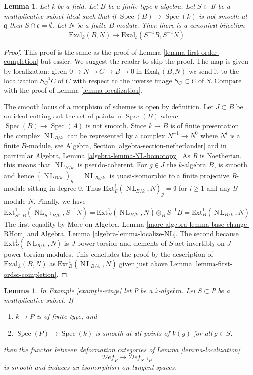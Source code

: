 \documentclass{stacks-project}
\theoremstyle{plain}
\newtheorem{lemma}[subsection]{Lemma}
\theoremstyle{definition}
\theoremstyle{remark}
\numberwithin{equation}{subsection}
\def\Spec{\mathop{\mathrm{Spec}}}
\def\NL{\mathop{N\!L}\nolimits}
\def\Deformationcategory{\mathcal{D}\!\mathit{ef}}
\begin{document}
\begin{lemma}
\label{lemma-first-order-localization}
Let $k$ be a field. Let $B$ be a finite type $k$-algebra.
Let $S \subset B$ be a multiplicative subset ideal such that
if $\Spec(B) \to \Spec(k)$ is not smooth at $\mathfrak q$
then $S \cap \mathfrak q = \emptyset$.
Let $N$ be a finite $B$-module.
Then there is a canonical bijection
$$
\text{Exal}_k(B, N) \to \text{Exal}_k(S^{-1}B, S^{-1}N)
$$
\end{lemma}

\begin{proof}
This proof is the same as the proof of
Lemma \ref{lemma-first-order-completion} but easier. We suggest the
reader to skip the proof.
The map is given by localization: given $0 \to N \to C \to B \to 0$
in $\text{Exal}_k(B, N)$ we send it to the localization $S_C^{-1}C$
of $C$ with respect to the inverse image $S_C \subset C$ of $S$.
Compare with the proof of Lemma \ref{lemma-localization}.

\medskip\noindent
The smooth locus of a morphism of schemes is open by definition.
Let $J \subset B$ be an ideal cutting out the set of points
in $\Spec(B)$ where $\Spec(B) \to \Spec(A)$ is not smooth.
Since $k \to B$ is of finite presentation the complex
$\NL_{B/k}$ can be represented by a complex
$N^{-1} \to N^0$ where $N^i$ is a finite $B$-module, see
Algebra, Section \ref{algebra-section-netherlander} and
in particular
Algebra, Lemma \ref{algebra-lemma-NL-homotopy}.
As $B$ is Noetherian, this means that $\NL_{B/k}$
is pseudo-coherent. For $g \in J$ the $k$-algebra $B_g$
is smooth and hence $(\NL_{B/k})_g = \NL_{B_g/k}$
is quasi-isomorphic to a finite projective $B$-module sitting in degree $0$.
Thus $\text{Ext}^i_B(\NL_{B/k}, N)_g = 0$ for $i \geq 1$
and any $B$-module $N$. Finally, we have
$$
\text{Ext}^1_{S^{-1}B}(\NL_{S^{-1}B/k}, S^{-1}N) =
\text{Ext}^1_B(\NL_{B/k}, N) \otimes_B S^{-1}B =
\text{Ext}^1_B(\NL_{B/k}, N)
$$
The first equality by
More on Algebra, Lemma \ref{more-algebra-lemma-base-change-RHom}
and Algebra, Lemma \ref{algebra-lemma-localize-NL}.
The second because $\text{Ext}^1_B(\NL_{B/k}, N)$ is $J$-power
torsion and elements of $S$ act invertibly on $J$-power torsion modules.
This concludes the proof by the description of $\text{Exal}_A(B, N)$
as $\text{Ext}^1_B(\NL_{B/A}, N)$ given just above
Lemma \ref{lemma-first-order-completion}.
\end{proof}

\begin{lemma}
\label{lemma-smooth-localization}
In Example \ref{example-rings} let $P$ be a $k$-algebra.
Let $S \subset P$ be a multiplicative subset. If
\begin{enumerate}
\item $k \to P$ is of finite type, and
\item $\Spec(P) \to \Spec(k)$ is smooth at all points of
$V(g)$ for all $g \in S$.
\end{enumerate}
then the functor between deformation categories of
Lemma \ref{lemma-localization}
$$
\Deformationcategory_P \longrightarrow \Deformationcategory_{S^{-1}P}
$$
is smooth and induces an isomorphism on tangent spaces.
\end{lemma}
\end{document}
